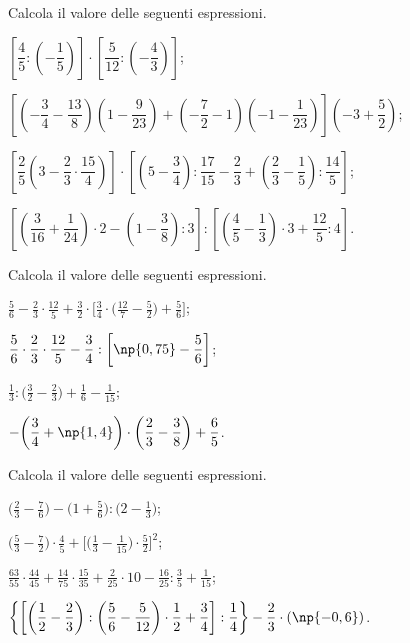 \begin{esercizio}[\Ast]%
 \label{ese:3.135}
 Calcola il valore delle seguenti espressioni.
\begin{enumeratea}
\spazielenx
\item $\left[\dfrac{4}{5}:\left(-\dfrac{1}{5}\right)\right]\cdot\left[\dfrac{5}{12}:\left(-\dfrac{4}{3}\right)\right]$;
\item $\left[\left(-\dfrac{3}{4}-\dfrac{13}{8}\right)\left(1-\dfrac{9}{23}\right)+\left(-\dfrac{7}{2}-1\right)\left(-1-\dfrac{1}{23}\right)\right]\left(-3+\dfrac{5}{2}\right)$;
\item $\left[\dfrac{2}{5}\left(3-\dfrac{2}{3}\cdot\dfrac{15}{4}\right)\right]\cdot\left[\left(5-\dfrac{3}{4}\right):\dfrac{17}{15}-\dfrac{2}{3}+\left(\dfrac{2}{3}-\dfrac{1}{5}\right):\dfrac{14}{5}\right]$;
\item $\left[\left(\dfrac{3}{16}+\dfrac{1}{24}\right)\cdot 2-\left(1-\dfrac{3}{8}\right):3\right]:\left[\left(\dfrac{4}{5}-\dfrac{1}{3}\right)\cdot 3+\dfrac{12}{5}:4\right]$.
\end{enumeratea}
\end{esercizio}

\begin{esercizio}[\Ast]%
 \label{ese:3.136}
 Calcola il valore delle seguenti espressioni.
\begin{enumeratea}
\spazielenx
\item $\displaystyle{\frac{5}{6}-\frac{2}{3}\cdot\frac{12}{5}+\frac{3}{2}\cdot\bigg[\frac{3}{4}\cdot%
\bigg(\frac{12}{7}-\frac{5}{2}\bigg)+\frac{5}{6}\bigg]}$;
\item $\displaystyle{\frac{5}{6}\cdot{\frac{2}{3}}\cdot\frac{12}{5}-\frac{3}{4}:\bigg[%
\np{0,75}-\frac{5}{6}\bigg]}$;
\item $\displaystyle{\frac{1}{3}:\bigg(\frac{3}{2}-\frac{2}{3}\bigg)+\frac{1}{6}-\frac{1}{15}}$;
\item $\displaystyle{-\bigg(\frac{3}{4}+\np{1,4}\bigg)\cdot\bigg(\frac{2}{3}-\frac{3}{8}\bigg)+\frac{6}{5}}$.
\end{enumeratea}
\end{esercizio}

\begin{esercizio}[\Ast]%
 \label{ese:3.137}
 Calcola il valore delle seguenti espressioni.
\begin{enumeratea}
\spazielenx
\item $\displaystyle{\bigg(\frac{2}{3}-\frac{7}{6}\bigg)-\bigg(1+\frac{5}{6}\bigg):\bigg(2-\frac{1}{3}\bigg)}$;
\item $\displaystyle{\bigg(\frac{5}{3}-\frac{7}{2}\bigg)\cdot\frac{4}{5}+\bigg[\bigg(\frac{1}{3}-\frac{1}{15}\bigg)%
\cdot\frac{5}{2}\bigg]^{2}}$;
\item $\displaystyle{\frac{63}{55}\cdot\frac{44}{45}+\frac{14}{75}\cdot\frac{15}{35}+\frac{2}{25}\cdot%
10-\frac{16}{25}:\frac{3}{5}+\frac{1}{15}}$;
\item $\displaystyle{\bigg\{\bigg[\bigg(\frac{1}{2}-\frac{2}{3}\bigg):\bigg(\frac{5}{6}-\frac{5}{12}\bigg)\cdot%
\frac{1}{2}+\frac{3}{4}\bigg]:\frac{1}{4}\bigg\}-\frac{2}{3}\cdot(\np{-0,6})}$.
\end{enumeratea}
\end{esercizio}

